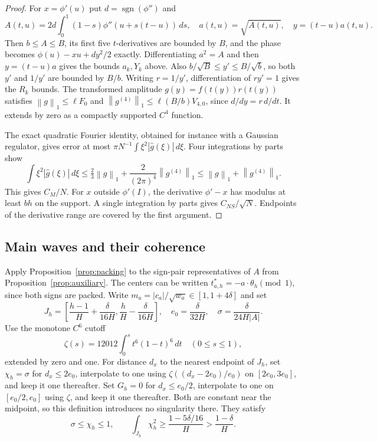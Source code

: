 \documentclass[11pt]{article}
\theoremstyle{remark}
\newcommand{\sgn}{\operatorname{sgn}}
\newcommand{\norm}[1]{\left\|#1\right\|}
\begin{document}
\begin{proof}
For $x=\phi'(u)$ put $d=\sgn(\phi'')$ and
\[
 A(t,u)=2d\int_0^1(1-s)\phi''(u+s(t-u))\,ds,
 \quad a(t,u)=\sqrt{A(t,u)},\quad y=(t-u)a(t,u).
\]
Then $b\le A\le B$, its first five $t$-derivatives are bounded by $B$,
and the phase becomes $\phi(u)-xu+dy^2/2$ exactly. Differentiating
$a^2=A$ and then $y=(t-u)a$ gives the bounds $a_k,Y_k$ above.
Also $b/\sqrt B\le y'\le B/\sqrt b$, so both $y'$ and $1/y'$ are
bounded by $B/b$. Writing $r=1/y'$, differentiation of $ry'=1$ gives
the $R_k$ bounds. The transformed amplitude $g(y)=f(t(y))r(t(y))$
satisfies $\norm g_1\le\ell F_0$ and
$\norm{g^{(4)}}_1\le\ell(B/b)V_{4,0}$, since $d/dy=r\,d/dt$.
It extends by zero as a compactly supported $C^4$ function.

The exact quadratic Fourier identity, obtained for instance with a
Gaussian regulator, gives error at most
$\pi N^{-1}\int\xi^2|\widehat g(\xi)|\,d\xi$.
Four integrations by parts show
\[
 \int\xi^2|\widehat g(\xi)|\,d\xi
 \le\tfrac23\norm g_1+\frac2{(2\pi)^4}\norm{g^{(4)}}_1
 \le\norm g_1+\norm{g^{(4)}}_1.
\]
This gives $C_M/N$. For $x$ outside $\phi'(I)$, the derivative
$\phi'-x$ has modulus at least $bh$ on the support. A single integration
by parts gives $C_{NS}/\sqrt N$. Endpoints of the derivative range are
covered by the first argument.
\end{proof}

\subsection{Main waves and their coherence}

Apply Proposition~\ref{prop:packing} to the sign-pair representatives of
$A$ from Proposition~\ref{prop:auxiliary}. The centers can be written
$t^*_{a,h}=-a\cdot\theta_h\pmod1$, since both signs are packed.
Write $m_a=|c_a|/\sqrt{w_a}\in[1,1+4\delta]$ and set
\begin{equation}\label{eq:cutoff-parameters}
 J_h=\left[\frac{h-1}H+\frac{\delta}{16H},
             \frac hH-\frac{\delta}{16H}\right],\quad
 e_0=\frac{\delta}{32H},\quad
 \sigma=\frac{\delta}{24H|A|}.
\end{equation}
Use the monotone $C^6$ cutoff
\[
 \zeta(s)=12012\int_0^s t^6(1-t)^6\,dt\quad(0\le s\le1),
\]
extended by zero and one. For distance $d_x$ to the nearest endpoint of
$J_h$, set $\chi_h=\sigma$ for $d_x\le2e_0$, interpolate to one using
$\zeta((d_x-2e_0)/e_0)$ on $[2e_0,3e_0]$, and keep it one thereafter.
Set $G_h=0$ for $d_x\le e_0/2$, interpolate to one on $[e_0/2,e_0]$
using $\zeta$, and keep it one thereafter. Both are constant near the
midpoint, so this definition introduces no singularity there. They satisfy
\[
 \sigma\le\chi_h\le1,\qquad
 \int_{J_h}\chi_h^2\ge\frac{1-5\delta/16}{H}
                         >\frac{1-\delta}{H}.
\]
\end{document}
